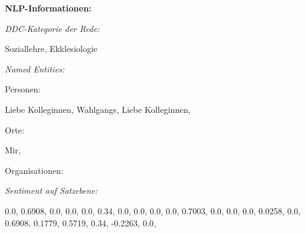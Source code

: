 \documentclass[10pt, a4paper]{report}
\begin{document}
\textbf{NLP-Informationen:}

\textit{DDC-Kategorie der Rede:}

Soziallehre, Ekklesiologie

\textit{Named Entities:}

Personen:

Liebe Kolleginnen, Wahlgangs, Liebe Kolleginnen, 

Orte:

Mir, 

Organisationen:



\textit{Sentiment auf Satzebene:}

0.0, 0.6908, 0.0, 0.0, 0.0, 0.34, 0.0, 0.0, 0.0, 0.0, 0.7003, 0.0, 0.0, 0.0, 0.0258, 0.0, 0.6908, 0.1779, 0.5719, 0.34, -0.2263, 0.0, 
\end{document}

